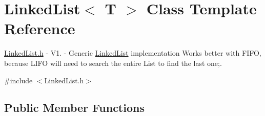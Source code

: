 \hypertarget{classLinkedList}{\section{Linked\-List$<$ T $>$ Class Template Reference}
\label{classLinkedList}
}


\hyperlink{LinkedList_8h}{Linked\-List.\-h} -\/ V1. -\/ Generic \hyperlink{classLinkedList}{Linked\-List} implementation Works better with F\-I\-F\-O, because L\-I\-F\-O will need to search the entire List to find the last one;.  




{\ttfamily \#include $<$Linked\-List.\-h$>$}

\subsection*{Public Member Functions}
